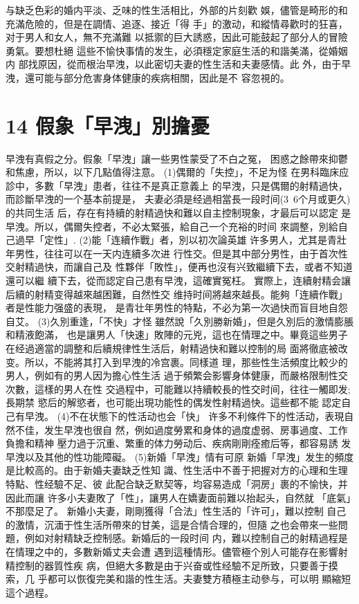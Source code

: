 \documentclass[12pt,UTF8]{ctexbook}
\begin{document}
与缺乏色彩的婚内平淡、乏味的性生活相比，外部的片刻歡
娛，儘管是畸形的和充滿危險的，但是在調情、追逐、接近「得
手」的激动，和縱情尋歡时的狂喜，对于男人和女人，無不充滿難
以抵禦的巨大誘惑，因此可能鼓起了部分人的冒險勇氣。要想杜絕
這些不愉快事情的发生，必須穩定家庭生活的和諧美滿，從婚姻内
部找原因，從而根治早洩，以此密切夫妻的性生活和夫妻感情。此
外，由于早洩，還可能与部分危害身体健康的疾病相關，因此是不
容忽視的。

\section{14 假象「早洩」別擔憂}

早洩有真假之分。假象「早洩」讓一些男性蒙受了不白之冤，
困惑之餘帶來抑鬱和焦慮，所以，以下几點值得注意。
(1)偶爾的「失控」，不足为怪
在男科臨床应診中，多數「早洩」患者，往往不是真正意義上
的早洩，只是偶爾的射精過快，而診斷早洩的一个基本前提是，
夫妻必須是经過相當長一段时间(3~6个月或更久)的共同生活
后，存在有持續的射精過快和難以自主控制現象，才最后可以認定
是早洩。所以，偶爾失控者，不必太緊張，給自己一个充裕的时间
來調整，別給自己過早「定性」.
(2)能「连續作戰」者，別以初次論英雄
许多男人，尤其是青壯年男性，往往可以在一天内连續多次进
行性交。但是其中部分男性，由于首次性交射精過快，而讓自己及
性夥伴「敗性」，便再也沒有兴致繼續下去，或者不知道還可以繼
續下去，從而認定自己患有早洩，這確實冤枉。
實際上，连續射精会讓后續的射精变得越來越困難，自然性交
维持时间將越來越長。能夠「连續作戰」者是性能力强盛的表現，
是青壮年男性的特點，不必为第一次過快而盲目地自怨自艾。
(3)久別重逢，「不快」才怪
雖然說「久別勝新婚」，但是久別后的激情膨脹和精液飽滿，
也是讓男人「快速」敗陣的元兇，這也在情理之中。畢竟這些男子
在经過適當的調整和后續規律性生活后，射精過快和難以控制的局
面將徹底被改变。所以，不能將其打入到早洩的冷宫裹。同樣道
理，那些性生活頻度比較少的男人，例如有的男人因为擔心性生活
過于頻繁会影響身体健康，而嚴格限制性交次數，這樣的男人在性
交過程中，可能難以持續較長的性交时间，往往一觸即发;長期禁
慾后的解慾者，也可能出現功能性的偶发性射精過快。這些都不能
認定自己有早洩。
(4)不在状態下的性活动也会「快」
许多不利條件下的性活动，表現自然不佳，发生早洩也很自
然，例如過度勞累和身体的過度虚弱、房事過度、工作負擔和精神
壓力過于沉重、繁重的体力勞动后、疾病剛剛痊癒后等，都容易誘
发早洩以及其他的性功能障礙。
(5)新婚「早洩」情有可原
新婚「早洩」发生的頻度是比較高的。由于新婚夫妻缺乏性知
識、性生活中不善于把握对方的心理和生理特點、性经驗不足、彼
此配合缺乏默契等，均容易造成「洞房」裹的不愉快，并因此而讓
许多小夫妻敗了「性」，讓男人在嬌妻面前難以抬起头，自然就
「底氣」不那麼足了。
新婚小夫妻，剛剛獲得「合法」性生活的「许可」，難以控制
自己的激情，沉湎于性生活所帶來的甘美，這是合情合理的，但隨
之也会帶來一些問題，例如对射精缺乏控制感。新婚后的一段时间
内，難以控制自己的射精過程是在情理之中的，多數新婚丈夫会遭
遇到這種情形。儘管極个別人可能存在影響射精控制的器質性疾
病，但絕大多數是由于兴奋或性经驗不足所致，只要善于摸索，几
乎都可以恢復完美和諧的性生活。夫妻雙方積極主动參与，可以明
顯縮短這个過程。
\end{document}

